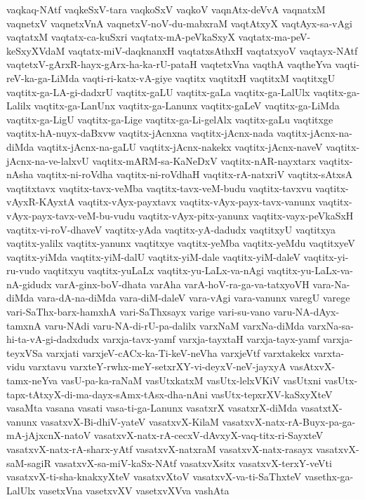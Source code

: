 {vaqkaq-NAtf
vaqkeSxV-tara
vaqkoSxV
vaqkoV
vaqnAtx-deVvA
vaqnatxM
vaqnetxV
vaqnetxVnA
vaqnetxV-noV-du-mabxraM
vaqtAtxyX
vaqtAyx-sa-vAgi
vaqtatxM
vaqtatx-ca-kuSxri
vaqtatx-mA-peVkaSxyX
vaqtatx-ma-peV-keSxyXVdaM
vaqtatx-miV-daqknanxH
vaqtatxsAthxH
vaqtatxyoV
vaqtayx-NAtf
vaqtetxV-gArxR-hayx-gArx-ha-ka-rU-pataH
vaqtetxVna
vaqthA
vaqtheYva
vaqti-reV-ka-ga-LiMda
vaqti-ri-katx-vA-giye
vaqtitx
vaqtitxH
vaqtitxM
vaqtitxgU
vaqtitx-ga-LA-gi-dadxrU
vaqtitx-gaLU
vaqtitx-gaLa
vaqtitx-ga-LalUlx
vaqtitx-ga-Lalilx
vaqtitx-ga-LanUnx
vaqtitx-ga-Lanunx
vaqtitx-gaLeV
vaqtitx-ga-LiMda
vaqtitx-ga-LigU
vaqtitx-ga-Lige
vaqtitx-ga-Li-gelAlx
vaqtitx-gaLu
vaqtitxge
vaqtitx-hA-nuyx-daBxvw
vaqtitx-jAcnxna
vaqtitx-jAcnx-nada
vaqtitx-jAcnx-na-diMda
vaqtitx-jAcnx-na-gaLU
vaqtitx-jAcnx-nakekx
vaqtitx-jAcnx-naveV
vaqtitx-jAcnx-na-ve-lalxvU
vaqtitx-mARM-sa-KaNeDxV
vaqtitx-nAR-nayxtarx
vaqtitx-nAsha
vaqtitx-ni-roVdha
vaqtitx-ni-roVdhaH
vaqtitx-rA-natxriV
vaqtitx-sAtxsA
vaqtitxtavx
vaqtitx-tavx-veMba
vaqtitx-tavx-veM-budu
vaqtitx-tavxvu
vaqtitx-vAyxR-KAyxtA
vaqtitx-vAyx-payxtavx
vaqtitx-vAyx-payx-tavx-vanunx
vaqtitx-vAyx-payx-tavx-veM-bu-vudu
vaqtitx-vAyx-pitx-yanunx
vaqtitx-vayx-peVkaSxH
vaqtitx-vi-roV-dhaveV
vaqtitx-yAda
vaqtitx-yA-dadudx
vaqtitxyU
vaqtitxya
vaqtitx-yalilx
vaqtitx-yanunx
vaqtitxye
vaqtitx-yeMba
vaqtitx-yeMdu
vaqtitxyeV
vaqtitx-yiMda
vaqtitx-yiM-dalU
vaqtitx-yiM-dale
vaqtitx-yiM-daleV
vaqtitx-yi-ru-vudo
vaqtitxyu
vaqtitx-yuLaLx
vaqtitx-yu-LaLx-va-nAgi
vaqtitx-yu-LaLx-va-nA-gidudx
varA-ginx-boV-dhata
varAha
varA-hoV-ra-ga-va-tatxyoVH
vara-Na-diMda
vara-dA-na-diMda
vara-diM-daleV
vara-vAgi
vara-vanunx
varegU
varege
vari-SaThx-barx-hamxhA
vari-SaThxsayx
varige
vari-su-vano
varu-NA-dAyx-tamxnA
varu-NAdi
varu-NA-di-rU-pa-dalilx
varxNaM
varxNa-diMda
varxNa-sa-hi-ta-vA-gi-dadxdudx
varxja-tavx-yamf
varxja-tayxtaH
varxja-tayx-yamf
varxja-teyxVSa
varxjati
varxjeV-cACx-ka-Ti-keV-neVha
varxjeVtf
varxtakekx
varxta-vidu
varxtavu
varxteY-rwhx-meY-setxrXY-vi-deyxV-neV-jayxyA
vasAtxvX-tamx-neYva
vasU-pa-ka-raNaM
vasUtxkatxM
vasUtx-lelxVKiV
vasUtxni
vasUtx-tapx-tAtxyX-di-ma-dayx-sAmx-tAsx-dha-nAni
vasUtx-tepxrXV-kaSxyXteV
vasaMta
vasana
vasati
vasa-ti-ga-Lanunx
vasatxrX
vasatxrX-diMda
vasatxtX-vanunx
vasatxvX-Bi-dhiV-yateV
vasatxvX-KilaM
vasatxvX-natx-rA-Buyx-pa-ga-mA-jAjxcnX-natoV
vasatxvX-natx-rA-cecxV-dAvxyX-vaq-titx-ri-SayxteV
vasatxvX-natx-rA-sharx-yAtf
vasatxvX-natxraM
vasatxvX-natx-rasayx
vasatxvX-saM-sagiR
vasatxvX-sa-miV-kaSx-NAtf
vasatxvXsitx
vasatxvX-terxY-veVti
vasatxvX-ti-sha-knakxyXteV
vasatxvXtoV
vasatxvX-va-ti-SaThxteV
vasethx-ga-LalUlx
vasetxVna
vasetxvXV
vasetxvXVva
vashAta
}
